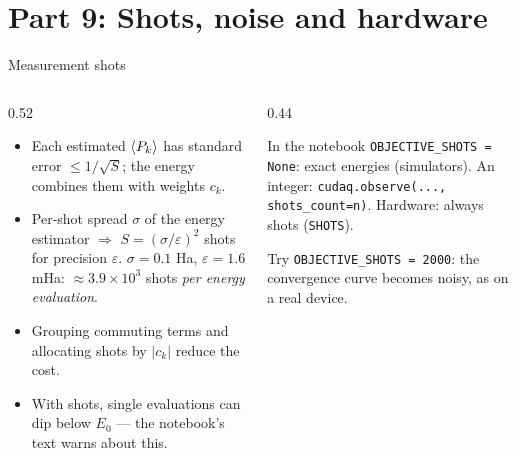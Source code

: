\documentclass[aspectratio=169,11pt]{beamer}
\begin{document}
\section{Part 9: Shots, noise and hardware}
\begin{frame}{Measurement shots}
  \begin{columns}[T]
    \begin{column}{0.52\textwidth}
      \begin{itemize}
        \item Each estimated $\braket{P_k}$ has standard error $\le 1/\sqrt{S}$; the energy combines them with weights $c_k$.
        \item Per-shot spread $\sigma$ of the energy estimator $\Rightarrow$ $S = (\sigma/\varepsilon)^2$ shots for precision $\varepsilon$.
          $\sigma = 0.1$ Ha, $\varepsilon = 1.6$ mHa: $\approx 3.9\times10^3$ shots \emph{per energy evaluation}.
        \item Grouping commuting terms and allocating shots by $|c_k|$ reduce the cost.
        \item With shots, single evaluations can dip below $E_0$ --- the notebook's text warns about this.
      \end{itemize}
    \end{column}
    \begin{column}{0.44\textwidth}
      \begin{block}{In the notebook}
        \texttt{OBJECTIVE\_SHOTS = None}: exact energies (simulators). An integer: \texttt{cudaq.observe(..., shots\_count=n)}.
        Hardware: always shots (\texttt{SHOTS}).
      \end{block}
      \small Try \texttt{OBJECTIVE\_SHOTS = 2000}: the convergence curve becomes noisy, as on a real device.
    \end{column}
  \end{columns}
\end{frame}
\end{document}

